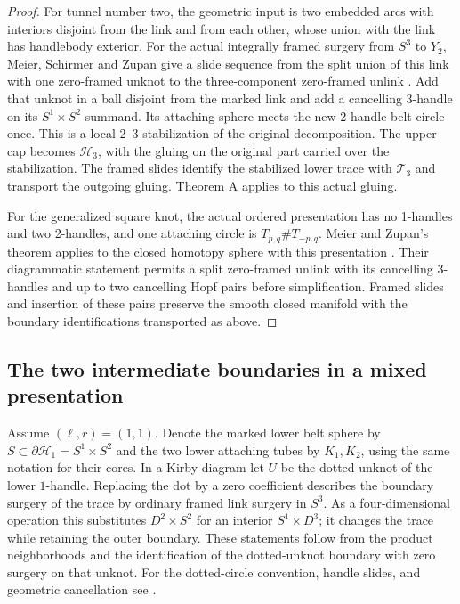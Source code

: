 \documentclass[11pt,letterpaper]{article}
\numberwithin{equation}{section}
\newcommand{\HB}[1]{\mathcal H_{#1}}
\newcommand{\TB}[1]{\mathcal T_{#1}}
\begin{document}
\begin{proof}
For tunnel number two, the geometric input is two embedded arcs
with interiors disjoint from the link and from each other, whose
union with the link has handlebody exterior. For the actual
integrally framed surgery from \(S^3\) to \(Y_2\), Meier, Schirmer
and Zupan give a slide sequence from the split union of this link
with one zero-framed unknot to the three-component zero-framed
unlink \cite[Corollary 1.3(2), \(c=2\), \(k=0\)]{MeierSchirmerZupan2016Trisections}.
Add that unknot in a ball disjoint from the marked link and add
a cancelling 3-handle on its \(S^1\times S^2\) summand. Its
attaching sphere meets the new 2-handle belt circle once. This is
a local 2--3 stabilization of the original decomposition. The
upper cap becomes \(\HB{3}\), with the gluing on the original
part carried over the stabilization. The framed slides identify
the stabilized lower trace with \(\TB{3}\) and transport the
outgoing gluing. Theorem A applies to this actual gluing.

For the generalized square knot, the actual ordered presentation
has no 1-handles and two 2-handles, and one attaching circle is
\(T_{p,q}\#T_{-p,q}\). Meier and Zupan's theorem applies to the
closed homotopy sphere with this presentation
\cite[Theorems 1.1--1.2]{MeierZupan2022SquareKnots}. Their
diagrammatic statement permits a split zero-framed unlink with
its cancelling 3-handles and up to two cancelling Hopf pairs
before simplification. Framed slides and insertion of these pairs
preserve the smooth closed manifold with the boundary
identifications transported as above.
\end{proof}

\subsection{The two intermediate boundaries in a mixed presentation}

Assume \((\ell,r)=(1,1)\). Denote the marked lower belt sphere
by \(S\subset\partial\HB{1}=S^1\times S^2\) and the two lower
attaching tubes by \(K_1,K_2\), using the same notation for their
cores. In a Kirby diagram let \(U\) be the dotted unknot of the
lower \(1\)-handle. Replacing the dot by a zero coefficient
describes the boundary surgery of the trace by ordinary framed
link surgery in \(S^3\). As a four-dimensional operation this
substitutes \(D^2\times S^2\) for an interior \(S^1\times D^3\);
it changes the trace while retaining the outer boundary. These
statements follow from the product neighborhoods and the
identification of the dotted-unknot boundary with zero surgery
on that unknot. For the dotted-circle convention, handle slides,
and geometric cancellation see
\cite[\S1, pp.~898--899]{Stipsicz2003SpinCobordism}.
\end{document}
